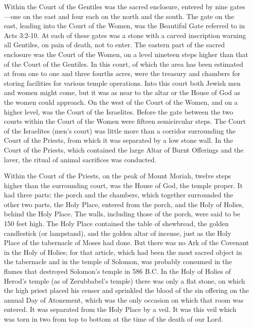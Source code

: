 Within the Court of the Gentiles was the sacred enclosure, entered by nine gates---one on the east and four each on the north and the south. The gate on the east, leading into the Court of the Women, was the Beautiful Gate referred to in Acts 3:2-10. At each of these gates was a stone with a carved inscription warning all Gentiles, on pain of death, not to enter. The eastern part of the sacred enclosure was the Court of the Women, on a level nineteen steps higher than that of the Court of the Gentiles. In this court, of which the area has been estimated at from one to one and three fourths acres, were the treasury and chambers for storing facilities for various temple operations. Into this court both Jewish men and women might come, but it was as near to the altar or the House of God as the women could approach. On the west of the Court of the Women, and on a higher level, was the Court of the Israelites. Before the gate between the two courts within the Court of the Women were fifteen semicircular steps. The Court of the Israelites (men's court) was little more than a corridor surrounding the Court of the Priests, from which it was separated by a low stone wall. In the Court of the Priests, which contained the large Altar of Burnt Offerings and the laver, the ritual of animal sacrifices was conducted.

Within the Court of the Priests, on the peak of Mount Moriah, twelve steps higher than the surrounding court, was the House of God, the temple proper. It had three parts: the porch and the chambers, which together surrounded the other two parts, the Holy Place, entered from the porch, and the Holy of Holies, behind the Holy Place. The walls, including those of the porch, were said to be 150 feet high. The Holy Place contained the table of shewbread, the golden candlestick (or lampstand), and the golden altar of incense, just as the Holy Place of the tabernacle of Moses had done. But there was no Ark of the Covenant in the Holy of Holies; for that article, which had been the most sacred object in the tabernacle and in the temple of Solomon, was probably consumed in the flames that destroyed Solomon's temple in 586 B.C. In the Holy of Holies of Herod's temple (as of Zerubbabel's temple) there was only a flat stone, on which the high priest placed his censer and sprinkled the blood of the sin offering on the annual Day of Atonement, which was the only occasion on which that room was entered. It was separated from the Holy Place by a veil. It was this veil which was torn in two from top to bottom at the time of the death of our Lord.

